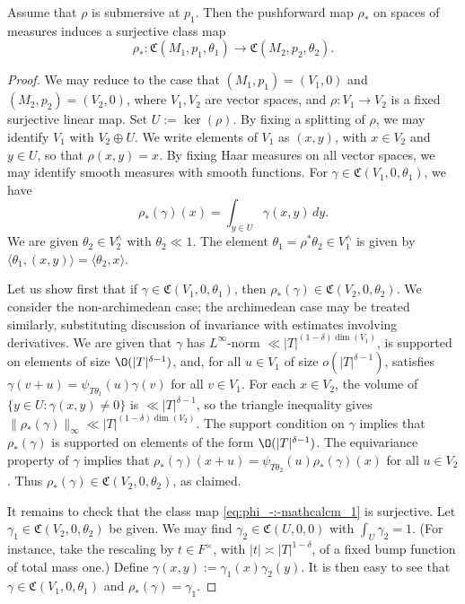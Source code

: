 \begin{proposition}\label{lem:assume-that-rho}
  Assume that $\rho$ is submersive at $p_1$.  Then the pushforward map $\rho_*$ on spaces of measures induces a surjective class map
  \begin{equation}\label{eq:phi_-:-mathcalcm_1}
    \rho_* : \mathfrak{C}(M_1,p_1,\theta_1) \rightarrow \mathfrak{C}(M_2,p_2,\theta_2).
  \end{equation}
\end{proposition}
\begin{proof}
  We may reduce to the case that $(M_1,p_1) = (V_1,0)$ and $(M_2,p_2) = (V_2,0)$, where $V_1, V_2$ are vector spaces, and $\rho : V_1 \rightarrow V_2$ is a fixed surjective linear map.  Set $U := \ker(\rho)$.  By fixing a splitting of $\rho$, we may identify $V_1$ with $V_2 \oplus U$.  We write elements of $V_1$ as $(x,y)$, with $x \in V_2$ and $y \in U$, so that $\rho(x,y) = x$.  By fixing Haar measures on all vector spaces, we may identify smooth measures with smooth functions.  For $\gamma \in \mathfrak{C}(V_1, 0, \theta_1)$, we have
  \begin{equation*}
    \rho_*(\gamma)(x) = \int_{y \in U}
    \gamma(x, y) \, d y.
  \end{equation*}
  We are given $\theta_2 \in V_2^\wedge$ with $\theta_2 \ll 1$.  The element $\theta_1 = \rho^* \theta_2 \in V_1^\wedge$ is given by $\langle \theta_1, (x,y) \rangle = \langle \theta_2, x \rangle$.

  Let us show first that if $\gamma \in \mathfrak{C}(V_1, 0, \theta_1)$, then $\rho_*(\gamma) \in \mathfrak{C}(V_2,0,\theta_2)$.  We consider the non-archimedean case; the archimedean case may be treated similarly, substituting discussion of invariance with estimates involving derivatives.  We are given that $\gamma$ has $L^\infty$-norm $\ll |T|^{(1 - \delta) \dim(V_1)}$, is supported on elements of size $\O(|T|^{\delta-1})$, and, for all $u \in V_1$ of size $o(|T|^{\delta-1})$, satisfies $\gamma(v + u) = \psi_{T \theta_1}(u) \gamma(v)$ for all $v \in V_1$.  For each $x \in V_2$, the volume of $\{y \in U : \gamma(x,y) \neq 0\}$ is $\ll |T|^{\delta-1}$, so the triangle inequality gives $\|\rho_*(\gamma)\|_{\infty} \ll |T|^{(1 - \delta) \dim(V_2)}$.  The support condition on $\gamma$ implies that $\rho_*(\gamma)$ is supported on elements of the form $\O(|T|^{\delta-1})$.  The equivariance property of $\gamma$ implies that $\rho_*(\gamma)(x + u) = \psi_{T \theta_2}(u) \rho_*(\gamma)(x)$ for all $u \in V_2$.  Thus $\rho_*(\gamma) \in \mathfrak{C}(V_2,0,\theta_2)$, as claimed.

  It remains to check that the class map \eqref{eq:phi_-:-mathcalcm_1} is surjective.  Let $\gamma_1 \in \mathfrak{C}(V_2,0,\theta_2)$ be given.  We may find $\gamma_2 \in \mathfrak{C}(U,0,0)$ with $\int_U \gamma_2 = 1$.  (For instance, take the rescaling by $t \in F^\times$, with $|t| \asymp |T|^{1-\delta}$, of a fixed bump function of total mass one.)  Define $\gamma(x,y) := \gamma_1(x) \gamma_2(y)$.  It is then easy to see that $\gamma \in \mathfrak{C}(V_1,0,\theta_1)$ and $\rho_*(\gamma) = \gamma_1$.
\end{proof}

